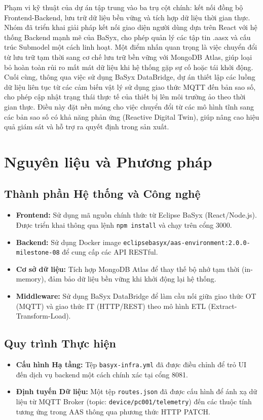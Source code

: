 \documentclass[twocolumn]{article}
\begin{document}
Phạm vi kỹ thuật của dự án tập trung vào ba trụ cột chính: kết nối đồng bộ Frontend-Backend, lưu trữ dữ liệu bền vững và tích hợp dữ liệu thời gian thực. Nhóm đã triển khai giải pháp kết nối giao diện người dùng dựa trên React với hệ thống Backend mạnh mẽ của BaSyx, cho phép quản lý các tập tin .aasx và cấu trúc Submodel một cách linh hoạt. Một điểm nhấn quan trọng là việc chuyển đổi từ lưu trữ tạm thời sang cơ chế lưu trữ bền vững với MongoDB Atlas, giúp loại bỏ hoàn toàn rủi ro mất mát dữ liệu khi hệ thống gặp sự cố hoặc tái khởi động. Cuối cùng, thông qua việc sử dụng BaSyx DataBridge, dự án thiết lập các luồng dữ liệu liên tục từ các cảm biến vật lý sử dụng giao thức MQTT đến bản sao số, cho phép cập nhật trạng thái thực tế của thiết bị lên môi trường ảo theo thời gian thực. Điều này đặt nền móng cho việc chuyển đổi từ các mô hình tĩnh sang các bản sao số có khả năng phản ứng (Reactive Digital Twin), giúp nâng cao hiệu quả giám sát và hỗ trợ ra quyết định trong sản xuất.
\section{Nguyên liệu và Phương pháp}
\subsection{Thành phần Hệ thống và Công nghệ}
\begin{itemize}
    \item \textbf{Frontend:} Sử dụng mã nguồn chính thức từ Eclipse BaSyx (React/Node.js). Được triển khai thông qua lệnh \texttt{npm install} và chạy trên cổng 3000.
    \item \textbf{Backend:} Sử dụng Docker image \texttt{eclipsebasyx/aas-environment:2.0.0-milestone-08} để cung cấp các API RESTful.
    \item \textbf{Cơ sở dữ liệu:} Tích hợp MongoDB Atlas để thay thế bộ nhớ tạm thời (in-memory), đảm bảo dữ liệu bền vững khi khởi động lại hệ thống.
    \item \textbf{Middleware:} Sử dụng BaSyx DataBridge để làm cầu nối giữa giao thức OT (MQTT) và giao thức IT (HTTP/REST) theo mô hình ETL (Extract-Transform-Load).
\end{itemize}

\subsection{Quy trình Thực hiện}
\begin{itemize}
    \item \textbf{Cấu hình Hạ tầng:} Tệp \texttt{basyx-infra.yml} đã được điều chỉnh để trỏ UI đến dịch vụ backend một cách chính xác tại cổng 8081.
    \item \textbf{Định tuyến Dữ liệu:} Một tệp \texttt{routes.json} đã được cấu hình để ánh xạ dữ liệu từ MQTT Broker (topic: \texttt{device/pc001/telemetry}) đến các thuộc tính tương ứng trong AAS thông qua phương thức HTTP PATCH.
\end{itemize}
\end{document}
